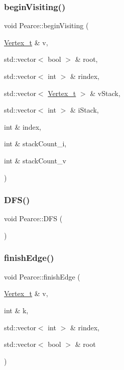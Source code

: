 \mbox{\label{class_pearce_ab9090eeb4466701bc8ba913d8f9f5b50}} 
\subsubsection{\texorpdfstring{begin\+Visiting()}{beginVisiting()}}
{\footnotesize\ttfamily void Pearce\+::begin\+Visiting (\begin{DoxyParamCaption}\item[{\hyperlink{class_graph_component_ae67114a6ce5a001dc35e1996e1b45aa0}{Vertex\+\_\+t} \&}]{v,  }\item[{std\+::vector$<$ bool $>$ \&}]{root,  }\item[{std\+::vector$<$ int $>$ \&}]{rindex,  }\item[{std\+::vector$<$ \hyperlink{class_graph_component_ae67114a6ce5a001dc35e1996e1b45aa0}{Vertex\+\_\+t} $>$ \&}]{v\+Stack,  }\item[{std\+::vector$<$ int $>$ \&}]{i\+Stack,  }\item[{int \&}]{index,  }\item[{int \&}]{stack\+Count\+\_\+i,  }\item[{int \&}]{stack\+Count\+\_\+v }\end{DoxyParamCaption})}

\mbox{\label{class_pearce_ad50f62a493ed2b5eb7fcb3c0f8e2e079}} 
\subsubsection{\texorpdfstring{D\+F\+S()}{DFS()}}
{\footnotesize\ttfamily void Pearce\+::\+D\+FS (\begin{DoxyParamCaption}{ }\end{DoxyParamCaption})}

\mbox{\label{class_pearce_a4ed2b91ac3246895ec5d70fe3530690e}} 
\subsubsection{\texorpdfstring{finish\+Edge()}{finishEdge()}}
{\footnotesize\ttfamily void Pearce\+::finish\+Edge (\begin{DoxyParamCaption}\item[{\hyperlink{class_graph_component_ae67114a6ce5a001dc35e1996e1b45aa0}{Vertex\+\_\+t} \&}]{v,  }\item[{int \&}]{k,  }\item[{std\+::vector$<$ int $>$ \&}]{rindex,  }\item[{std\+::vector$<$ bool $>$ \&}]{root }\end{DoxyParamCaption})}


